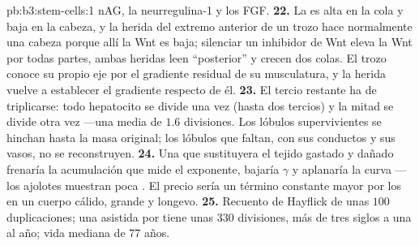 \begin{solution}{pb:b3:stem-cells:1}
nAG, la neurregulina-1 y los FGF.
\textbf{22.} La  es alta en la cola y baja en la cabeza,
y la herida del extremo anterior de un trozo hace normalmente una
cabeza porque allí la Wnt es baja; silenciar un inhibidor de Wnt eleva
la Wnt por todas partes, ambas heridas leen ``posterior'' y crecen dos
colas. El trozo conoce su propio eje por el gradiente residual de su
musculatura, y la herida vuelve a establecer el gradiente respecto de
él.
\textbf{23.} El tercio restante ha de triplicarse: todo hepatocito se
divide una vez (hasta dos tercios) y la mitad se divide otra vez ---una
media de $1.6$ divisiones. Los lóbulos supervivientes se hinchan hasta
la masa original; los lóbulos que faltan, con sus conductos y sus
vasos, no se reconstruyen.
\textbf{24.} Una  que sustituyera el tejido gastado y
dañado frenaría la acumulación que mide el exponente, bajaría $\gamma$
y aplanaría la curva ---los ajolotes muestran poca . El
precio sería un término constante mayor por los  en un cuerpo
cálido, grande y longevo.
\textbf{25.} Recuento de Hayflick de unas $100$ duplicaciones; una
 asistida por  tiene unas $330$ divisiones, más
de tres siglos a una al año; vida mediana de $77$ años.
\end{solution}
